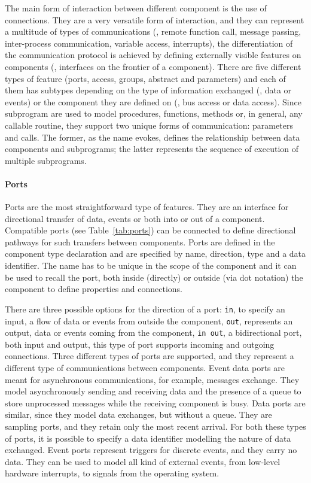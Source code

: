 The main form of interaction between different component is the use of connections. They are a very versatile form of interaction, and they can represent a multitude of types of communications (\eg, remote function call, message passing, inter-process communication, variable access, interrupts), the differentiation of the communication protocol is achieved by defining externally visible features on components (\ie, interfaces on the frontier of a component). There are five different types of feature (ports, access, groups, abstract and parameters) and each of them has subtypes depending on the type of information exchanged (\eg, data or events) or the component they are defined on (\eg, bus access or data access). Since subprogram are used to model procedures, functions, methods or, in general, any callable routine, they support two unique forms of communication: parameters and calls. The former, as the name evokes, defines the relationship between data components and subprograms; the latter represents the sequence of execution of multiple subprograms.

\paragraph{Ports}
Ports are the most straightforward type of features. They are an interface for directional transfer of data, events or both into or out of a component. Compatible ports (see Table~\ref{tab:ports}) can be connected to define directional pathways for such transfers between components. Ports are defined in the component type declaration and are specified by name, direction, type and a data identifier. The name has to be unique in the scope of the component and it can be used to recall the port, both inside (directly) or outside (via dot notation) the component to define properties and connections.

There are three possible options for the direction of a port: \texttt{in}, to specify an input, a flow of data or events from outside the component, \texttt{out}, represents an output, data or events coming from the component, \texttt{in out}, a bidirectional port, both input and output, this type of port supports incoming and outgoing connections. Three different types of ports are supported, and they represent a different type of communications between components. Event data ports are meant for asynchronous communications, for example, messages exchange. They model asynchronously sending and receiving data and the presence of a queue to store unprocessed messages while the receiving component is busy. Data ports are similar, since they model data exchanges, but without a queue. They are sampling ports, and they retain only the most recent arrival. For both these types of ports, it is possible to specify a data identifier modelling the nature of data exchanged. Event ports represent triggers for discrete events, and they carry no data. They can be used to model all kind of external events, from low-level hardware interrupts, to signals from the operating system.

